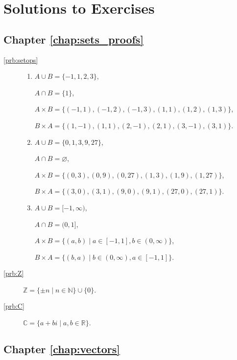 \chapter{Solutions to Exercises}
\footnotesize

\section*{Chapter \ref{chap:sets_proofs}}

\begin{description}
\item[\ref{prb:setops}]\begin{enumerate}[label=(\alph*)]
    \item $ A\cup B=\{-1,1,2,3\} $,
    
    $ A\cap B=\{1\} $,

    $ A\times B=\{(-1,1),(-1,2),(-1,3),(1,1),(1,2),(1,3)\} $,

    $ B\times A=\{(1,-1),(1,1),(2,-1),(2,1),(3,-1),(3,1)\} $.

    \item $ A\cup B=\{0,1,3,9,27\} $,
    
    $ A\cap B=\varnothing $,

    $ A\times B=\{(0,3),(0,9),(0,27),(1,3),(1,9),(1,27)\} $,

    $ B\times A=\{(3,0),(3,1),(9,0),(9,1),(27,0),(27,1)\} $.

    \item $ A\cup B=[-1,\infty) $,
    
    $ A\cap B=(0,1] $,

    $ A\times B=\{(a,b)\mid a\in[-1,1],b\in(0,\infty)\} $,

    $ B\times A=\{(b,a)\mid b\in(0,\infty),a\in[-1,1]\} $.
\end{enumerate}

\item[\ref{prb:Z}] $ \mathbb{Z}=\{\pm n\mid n\in\mathbb{N}\}\cup\{0\} $.

\item[\ref{prb:C}] $ \mathbb{C}=\{a+bi\mid a,b\in\mathbb{R}\} $.
\end{description}

\section*{Chapter \ref{chap:vectors}}

